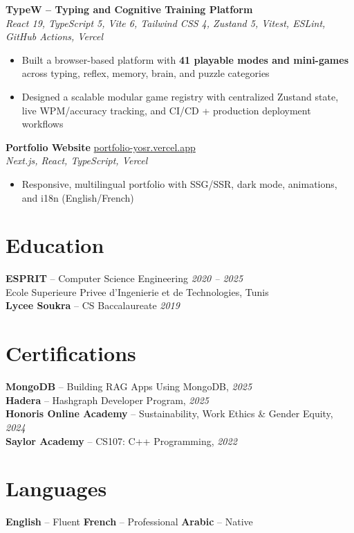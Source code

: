 \documentclass[10pt,a4paper]{article}
\begin{document}
{\vspace{3pt}
\textbf{TypeW -- Typing and Cognitive Training Platform} \\[1pt]
\textit{React 19, TypeScript 5, Vite 6, Tailwind CSS 4, Zustand 5, Vitest, ESLint, GitHub Actions, Vercel}
\begin{itemize}
  \item Built a browser-based platform with \textbf{41 playable modes and mini-games} across typing, reflex, memory, brain, and puzzle categories
  \item Designed a scalable modular game registry with centralized Zustand state, live WPM/accuracy tracking, and CI/CD + production deployment workflows
\end{itemize}

\vspace{3pt}
\textbf{Portfolio Website} \hfill \href{https://portfolio-yosr.vercel.app/en}{portfolio-yosr.vercel.app}\\[1pt]
\textit{Next.js, React, TypeScript, Vercel}
\begin{itemize}
  \item Responsive, multilingual portfolio with SSG/SSR, dark mode, animations, and i18n (English/French)
\end{itemize}

}

\section*{Education}
{\small
\textbf{ESPRIT} -- Computer Science Engineering \hfill \textit{2020 -- 2025}\\[1pt]
Ecole Superieure Privee d'Ingenierie et de Technologies, Tunis\\[3pt]
\textbf{Lycee Soukra} -- CS Baccalaureate \hfill \textit{2019}
}

\section*{Certifications}
{\small
\textbf{MongoDB} -- Building RAG Apps Using MongoDB, \textit{2025}\\[1pt]
\textbf{Hadera} -- Hashgraph Developer Program, \textit{2025}\\[1pt]
\textbf{Honoris Online Academy} -- Sustainability, Work Ethics \& Gender Equity, \textit{2024}\\[1pt]
\textbf{Saylor Academy} -- CS107: C++ Programming, \textit{2022}
}

\section*{Languages}
{\small
\textbf{English} -- Fluent \quad\textbar\quad \textbf{French} -- Professional \quad\textbar\quad \textbf{Arabic} -- Native
}
\end{document}
